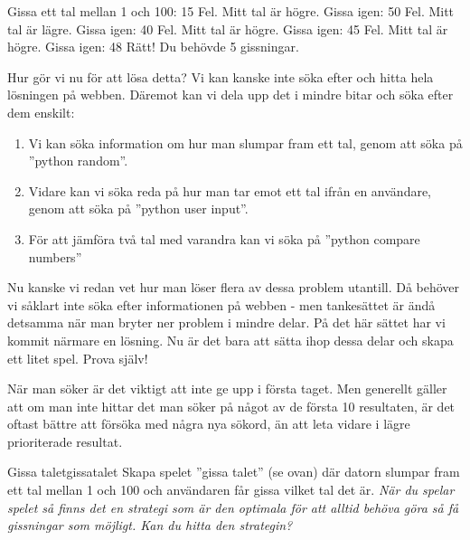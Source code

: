 \vspace{10pt}
\begin{python}
Gissa ett tal mellan 1 och 100: 15
Fel. Mitt tal är högre. Gissa igen: 50
Fel. Mitt tal är lägre. Gissa igen: 40
Fel. Mitt tal är högre. Gissa igen: 45
Fel. Mitt tal är högre. Gissa igen: 48
Rätt! Du behövde 5 gissningar.
\end{python}

Hur gör vi nu för att lösa detta? Vi kan kanske inte söka efter och hitta hela lösningen på webben. Däremot kan vi dela upp det i mindre bitar och söka efter dem enskilt:
\begin{enumerate}
	\item Vi kan söka information om hur man slumpar fram ett tal, genom att söka på ''python random''.
	\item Vidare kan vi söka reda på hur man tar emot ett tal ifrån en användare, genom att söka på ''python user input''.
	\item För att jämföra två tal med varandra kan vi söka på ''python compare numbers''
\end{enumerate}

Nu kanske vi redan vet hur man löser flera av dessa problem utantill. Då behöver vi såklart inte söka efter informationen på webben - men tankesättet är ändå detsamma när man bryter ner problem i mindre delar. På det här sättet har vi kommit närmare en lösning. Nu är det bara att sätta ihop dessa delar och skapa ett litet spel. Prova själv!

När man söker är det viktigt att inte ge upp i första taget. Men generellt gäller att om man inte hittar det man söker på något av de första 10 resultaten, är det oftast bättre att försöka med några nya sökord, än att leta vidare i lägre prioriterade resultat.


\begin{matteovning}{Gissa talet}{gissatalet}
Skapa spelet ''gissa talet'' (se ovan) där datorn slumpar fram ett tal mellan 1 och 100 och användaren får gissa vilket tal det är.
\newline
\newline
\emph{När du spelar spelet så finns det en strategi som är den optimala för att alltid behöva göra så få gissningar som möjligt. Kan du hitta den strategin?}
\end{matteovning}


